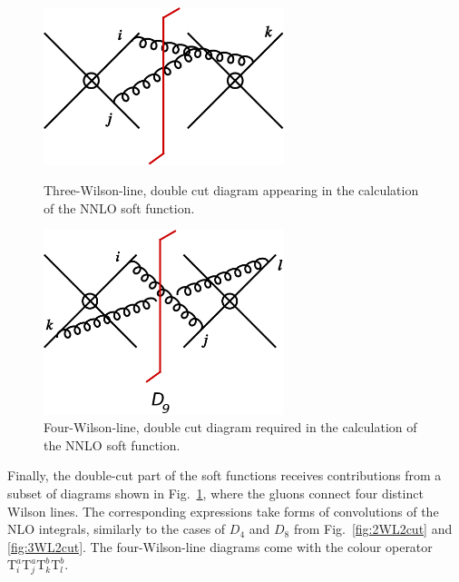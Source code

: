 \documentclass[a4paper,11pt]{article}
\def\cT{\bm{\mathrm{T}}}
\numberwithin{equation}{section}
\begin{document}
\begin{figure}[t]
  \begin{minipage}[t]{0.48\textwidth}
  \begin{center}
    \includegraphics[width=0.625\textwidth]{plots/sf-nnlo-8prime.png}
  \end{center}
  \caption{Three-Wilson-line, double cut diagram appearing in the calculation of
  the NNLO soft function.
  }
  \label{fig:3WLNA}
  \end{minipage}
  \hfill
  \begin{minipage}[t]{0.48\textwidth}
  \begin{center}
    \includegraphics[width=0.625\textwidth]{plots/sf-nnlo-4wl.png}
  \end{center}
  \caption{Four-Wilson-line, double cut diagram required in the calculation of
  the NNLO soft function.
  }
  \label{fig:4WL2cut}
  \end{minipage}
\end{figure}

Finally, the double-cut part of the soft functions receives contributions from a
subset of diagrams shown in Fig.~\ref{fig:4WL2cut}, where the gluons connect
four distinct Wilson lines. The corresponding expressions take forms of
convolutions of the NLO integrals, similarly to the cases of $D_4$ and $D_8$
from Fig.~\ref{fig:2WL2cut} and \ref{fig:3WL2cut}.  
The four-Wilson-line diagrams come with the colour operator
$\cT_i^a \cT_j^a \cT_k^b \cT_l^b$. 
\end{document}
